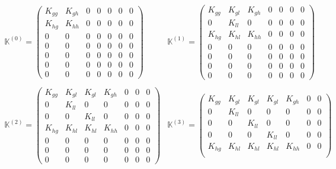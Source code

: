 \documentclass[10pt,a4paper]{article}
\begin{document}
\begin{equation}
\begin{array}{ll}
\mathbb{K}^{(0)} = 
\begin{pmatrix}
K_{gg} & K_{gh} & 0  & 0  & 0  & 0  & 0 \\
K_{hg} & K_{hh} & 0  & 0  & 0  & 0  & 0 \\
0 & 0 & 0  & 0  & 0  & 0  & 0 \\
0 & 0 & 0  & 0  & 0  & 0  & 0 \\
0 & 0 & 0  & 0  & 0  & 0  & 0 \\
0 & 0 & 0  & 0  & 0  & 0  & 0 \\
0 & 0 & 0  & 0  & 0  & 0  & 0
\end{pmatrix}
&
\mathbb{K}^{(1)} = 
\begin{pmatrix}
K_{gg} & K_{gl} & K_{gh} & 0  & 0  & 0  & 0 \\
0 & K_{ll} & 0 & 0  & 0  & 0  & 0  \\
K_{hg} & K_{hl} & K_{hh}  & 0  & 0  & 0  & 0 \\
0 & 0 & 0  & 0  & 0  & 0  & 0 \\
0 & 0 & 0  & 0  & 0  & 0  & 0 \\
0 & 0 & 0  & 0  & 0  & 0  & 0 \\
0 & 0 & 0  & 0  & 0  & 0  & 0
\end{pmatrix}
\\ \\
\mathbb{K}^{(2)} = 
\begin{pmatrix}
K_{gg} & K_{gl} & K_{gl} & K_{gh} & 0  & 0  & 0 \\
0 & K_{ll} & 0 & 0  & 0  & 0  & 0  \\
0 & 0 & K_{ll} & 0  & 0  & 0  & 0  \\
K_{hg} & K_{hl} & K_{hl} & K_{hh}  & 0  & 0  & 0 \\
0 & 0 & 0  & 0  & 0  & 0  & 0 \\
0 & 0 & 0  & 0  & 0  & 0  & 0 \\
0 & 0 & 0  & 0  & 0  & 0  & 0
\end{pmatrix}
&
\mathbb{K}^{(3)} = 
\begin{pmatrix}
K_{gg} & K_{gl} & K_{gl} & K_{gl} & K_{gh}  & 0  & 0 \\
0 & K_{ll} & 0 & 0  & 0  & 0  & 0  \\
0 & 0 & K_{ll} & 0  & 0  & 0  & 0  \\
0 & 0 & 0 & K_{ll} & 0  & 0  & 0  \\
K_{hg} & K_{hl} & K_{hl} & K_{hl} & K_{hh}  & 0  & 0 \\

\end{pmatrix}
\end{array}
\end{equation}
\end{document}
